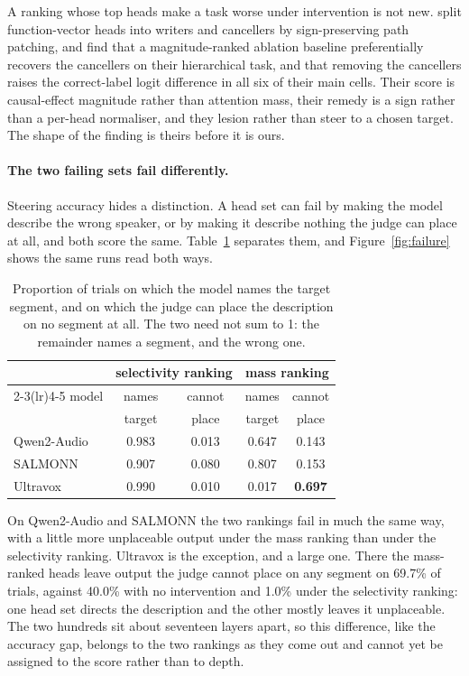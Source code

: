 \documentclass[11pt]{article}
\begin{document}
A ranking whose top heads make a task worse under intervention is not new.
\citet{writerscancellers2026} split function-vector heads into writers and
cancellers by sign-preserving path patching, and find that a magnitude-ranked
ablation baseline preferentially recovers the cancellers on their hierarchical
task, and that removing the cancellers raises the correct-label logit difference
in all six of their main cells. Their score is
causal-effect magnitude rather than attention mass, their remedy is a sign rather
than a per-head normaliser, and they lesion rather than steer to a chosen target.
The shape of the finding is theirs before it is ours.

\paragraph{The two failing sets fail differently.}
Steering accuracy hides a distinction. A head set can fail by making the model
describe the wrong speaker, or by making it describe nothing the judge can place
at all, and both score the same. Table~\ref{tab:failmode} separates them, and
Figure~\ref{fig:failure} shows the same runs read both ways.

\begin{table}[t]\centering\small
\begin{tabular}{lcccc}
\toprule
 & \multicolumn{2}{c}{selectivity ranking} & \multicolumn{2}{c}{mass ranking} \\
\cmidrule(lr){2-3}\cmidrule(lr){4-5}
model & names & cannot & names & cannot \\
      & target & place  & target & place \\
\midrule
Qwen2-Audio & 0.983 & 0.013 & 0.647 & 0.143 \\
SALMONN     & 0.907 & 0.080 & 0.807 & 0.153 \\
Ultravox    & 0.990 & 0.010 & 0.017 & \textbf{0.697} \\
\bottomrule
\end{tabular}
\caption{Proportion of trials on which the model names the target segment, and on
which the judge can place the description on no segment at all. The two need not
sum to 1: the remainder names a segment, and the wrong one.}
\label{tab:failmode}
\end{table}

On Qwen2-Audio and SALMONN the two rankings fail in much the same way, with a
little more unplaceable output under the mass ranking than under the selectivity
ranking. Ultravox is the exception, and a large one. There the mass-ranked heads
leave output the judge cannot place on any segment on 69.7\% of trials, against
40.0\% with no intervention and 1.0\% under the selectivity ranking: one head set
directs the description and the other mostly leaves it unplaceable. The two
hundreds sit about seventeen layers apart, so this difference, like the accuracy
gap, belongs to the two rankings as they come out and cannot yet be assigned to
the score rather than to depth.
\end{document}
